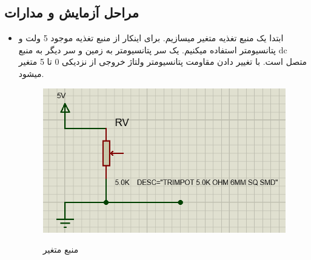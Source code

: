 \documentclass[twoside]{article}
\begin{document}
		\subsection*{مراحل آزمایش و مدارات}
		\begin{itemize}
			\item			
			ابتدا یک منبع تغذیه متغیر میسازیم. برای اینکار از منبع تغذیه موجود 5 ولت و پتانسیومتر استفاده میکنیم. یک سر پتانسیومتر به زمین و سر دیگر به منبع dc متصل است. با تغییر دادن مقاومت پتانسیومتر ولتاژ خروجی از نزدیکی 0 تا 5 متغیر میشود.
			\begin{figure}[h!]
				\begin{center}
					\includegraphics[scale=0.65]{variable_voltage}‎
					\caption{منبع متغیر}
				\end{center}
			\end{figure} 
			

\end{itemize}
\end{document}
